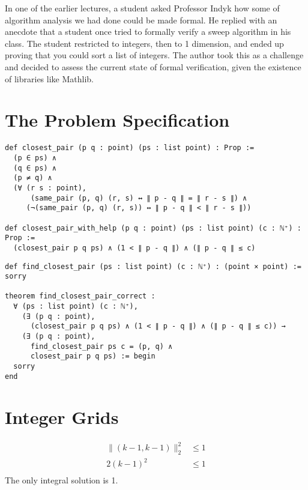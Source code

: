 \documentclass{article}
\begin{document}
In one of the earlier lectures, a student asked Professor Indyk how some of algorithm analysis we had done could be made formal.
He replied with an anecdote that a student once tried to formally verify a sweep algorithm in his class.
The student restricted to integers, then to 1 dimension, and ended up proving that you could sort a list of integers.
The author took this as a challenge and decided to assess the current state of formal verification, given the existence of libraries like Mathlib.

\section{The Problem Specification}

\begin{verbatim}
def closest_pair (p q : point) (ps : list point) : Prop :=
  (p ∈ ps) ∧
  (q ∈ ps) ∧
  (p ≠ q) ∧
  (∀ (r s : point),
      (same_pair (p, q) (r, s) ↔ ∥ p - q ∥ = ∥ r - s ∥) ∧
     (¬(same_pair (p, q) (r, s)) ↔ ∥ p - q ∥ < ∥ r - s ∥))

def closest_pair_with_help (p q : point) (ps : list point) (c : ℕ⁺) : Prop :=
  (closest_pair p q ps) ∧ (1 < ∥ p - q ∥) ∧ (∥ p - q ∥ ≤ c)
\end{verbatim}
\newpage


\begin{verbatim}
def find_closest_pair (ps : list point) (c : ℕ⁺) : (point × point) := sorry

theorem find_closest_pair_correct :
  ∀ (ps : list point) (c : ℕ⁺),
    (∃ (p q : point),
      (closest_pair p q ps) ∧ (1 < ∥ p - q ∥) ∧ (∥ p - q ∥ ≤ c)) →
    (∃ (p q : point),
      find_closest_pair ps c = (p, q) ∧
      closest_pair p q ps) := begin
  sorry
end
\end{verbatim}


\section{Integer Grids}
\begin{align*}
  \| (k - 1, k-1) \|_2^2 &\leq 1 \\
  2(k-1)^2 & \leq 1 \\
\end{align*}
The only integral solution is 1.
\end{document}
